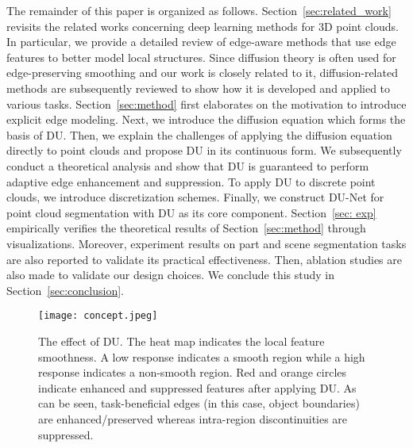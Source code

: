 \documentclass[a4paper,fleqn]{cas-dc}
\begin{document}
The remainder of this paper is organized as follows. Section~\ref{sec:related_work} revisits the related works concerning deep learning methods for 3D point clouds. In particular, we provide a detailed review of edge-aware methods that use edge features to better model local structures. Since diffusion theory is often used for edge-preserving smoothing and our work is closely related to it, diffusion-related methods are subsequently reviewed to show how it is developed and applied to various tasks. 
Section~\ref{sec:method} first elaborates on the motivation to introduce explicit edge modeling. Next, we introduce the diffusion equation which forms the basis of DU. Then, we explain the challenges of applying the diffusion equation directly to point clouds and propose DU in its continuous form. We subsequently conduct a theoretical analysis and show that DU is guaranteed to perform adaptive edge enhancement and suppression. To apply DU to discrete point clouds, we introduce discretization schemes. Finally, we construct DU-Net for point cloud segmentation with  DU as its core component.    
Section~\ref{sec: exp} empirically verifies the theoretical results of Section~\ref{sec:method} through visualizations. Moreover, experiment results on part and scene segmentation tasks are also reported to validate its practical effectiveness. Then, ablation studies are also made to validate our design choices.
We conclude this study in Section~\ref{sec:conclusion}.



\begin{figure}[t]
    \centering 
        \texttt{[image: concept.jpeg]}
    \caption{The effect of DU. The heat map indicates the local feature smoothness. A low response indicates a smooth region while a high response indicates a non-smooth region. Red and orange circles indicate enhanced and suppressed features after applying DU. As can be seen, task-beneficial edges (in this case, object boundaries) are enhanced/preserved whereas intra-region discontinuities are suppressed.  
}
    \label{fig: concept}
\end{figure}
\end{document}
